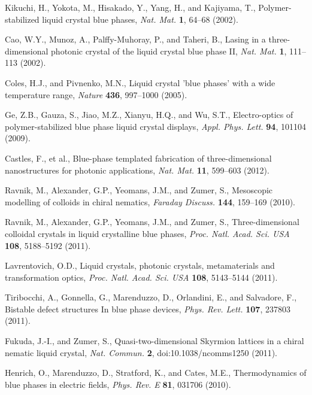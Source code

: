 \documentclass[12pt]{article}
\begin{document}
\begin{thebibliography}{99}
Kikuchi, H., Yokota, M., Hisakado, Y., Yang, H., and Kajiyama, T.,
Polymer-stabilized liquid crystal blue phases,
{\it Nat. Mat.} {\bf 1}, 64--68 (2002).

Cao, W.Y., Munoz, A., Palffy-Muhoray, P., and  Taheri, B.,
Lasing in a three-dimensional photonic crystal of the liquid crystal blue 
phase II,
{\it Nat. Mat.} {\bf 1}, 111--113 (2002).

Coles, H.J., and  Pivnenko, M.N.,
Liquid crystal 'blue phases' with a wide temperature range,
{\it Nature} {\bf 436}, 997--1000 (2005).

Ge, Z.B., Gauza, S., Jiao, M.Z., Xianyu, H.Q., and  Wu, S.T.,
 Electro-optics of polymer-stabilized blue phase liquid crystal displays,
{\it Appl. Phys. Lett.} {\bf 94}, 101104 (2009).

Castles, F., et al.,
Blue-phase templated fabrication of three-dimensional nanostructures for
photonic applications, {\it Nat. Mat.} {\bf 11}, 599--603 (2012).

Ravnik, M., Alexander, G.P., Yeomans, J.M., and Zumer, S.,
Mesoscopic modelling of colloids in chiral nematics,
{\it Faraday Discuss.} {\bf 144}, 159--169 (2010).

Ravnik, M., Alexander, G.P.,  Yeomans, J.M., and  Zumer, S.,
Three-dimensional colloidal crystals in liquid crystalline 
blue phases, {\it Proc. Natl. Acad. Sci. USA} {\bf 108}, 5188--5192 (2011).

 Lavrentovich, O.D.,
 Liquid crystals, photonic crystals, metamaterials and transformation optics, 
{\it Proc. Natl. Acad. Sci. USA} {\bf 108}, 5143--5144 (2011).

Tiribocchi, A., Gonnella, G., Marenduzzo, D., Orlandini, E., and Salvadore, F.,
Bistable defect structures In blue phase devices,
 {\it Phys. Rev. Lett.} {\bf 107}, 237803 (2011).

Fukuda, J.-I., and Zumer, S.,
Quasi-two-dimensional Skyrmion lattices in a chiral nematic liquid crystal,
{\it Nat. Commun.} {\bf 2}, doi:10.1038/ncomms1250 (2011).

Henrich, O., Marenduzzo, D., Stratford, K., and  Cates, M.E.,
Thermodynamics of blue phases in electric fields,
{\it Phys. Rev. E} {\bf 81}, 031706 (2010).


\end{thebibliography}
\end{document}

